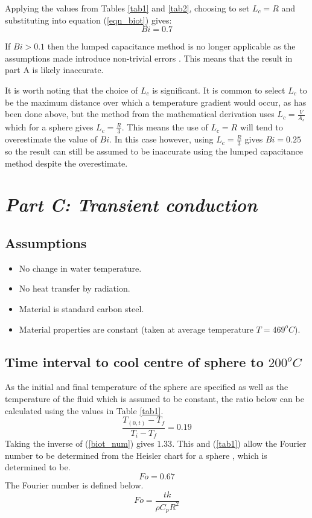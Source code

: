 \documentclass[11pt]{article}
\begin{document}
Applying the values from Tables \ref{tab1} and \ref{tab2}, choosing to set $L_{c}=R$ and substituting into equation (\ref{eqn_biot}) gives:
\begin{equation}\label{biot_num}
	Bi = 0.7
\end{equation}

If $Bi > 0.1$ then the lumped capacitance method is no longer applicable as the assumptions made introduce non-trivial errors \cite{bergman_fundamentals_2011}. This means that the result in part A is likely inaccurate.

It is worth noting that the choice of $L_c$ is significant. It is common to select $L_c$ to be the maximum distance over which a temperature gradient would occur, as has been done above, but the method from the mathematical derivation uses $L_c = \frac{V}{A_s}$ which for a sphere gives $L_c = \frac{R}{3}$. This means the use of $L_c = R$ will tend to overestimate the value of $Bi$. In this case however, using $L_c = \frac{R}{3}$ gives $Bi = 0.25$ so the result can still be assumed to be inaccurate using the lumped capacitance method despite the overestimate.

\section{\emph{Part C: Transient conduction}}
\subsection{Assumptions}
\begin{itemize}
	\item No change in water temperature.
	\item No heat transfer by radiation.
	\item Material is standard carbon steel.
	\item Material properties are constant (taken at average temperature $T = 469 ^{o}C$).
\end{itemize}
\subsection{Time interval to cool centre of sphere to $200 ^{o}C$}
As the initial and final temperature of the sphere are specified as well as the temperature of the fluid which is assumed to be constant, the ratio below can be calculated using the values in Table \ref{tab1}.
\begin{equation}\label{ratio_1}
	\frac{T_{(0,t)} -T_{f}}{T_{i} - T_{f}} = 0.19
\end{equation}
Taking the inverse of (\ref{biot_num}) gives $1.33$. This and (\ref{tab1}) allow the Fourier number to be determined from the Heisler chart for a sphere \cite{multidimensional-transient}, which is determined to be.
\begin{equation}\label{Fr_1}
	Fo = 0.67
\end{equation}
The Fourier number is defined below.
\begin{equation}\label{Fr_2}
	Fo = \frac{tk}{\rho C_{p} R^{2}}
\end{equation}
\end{document}

